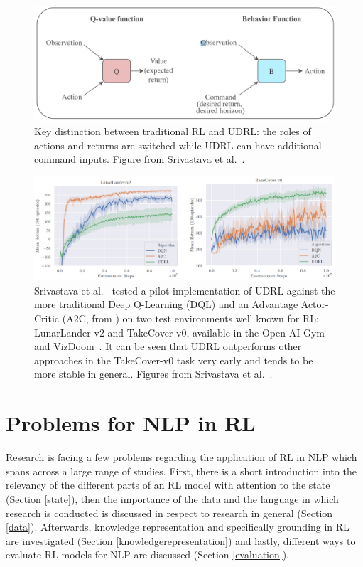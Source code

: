 \documentclass[11pt]{article}
\begin{document}
\begin{figure}[h!]
\centering
\includegraphics[scale=.42]{img/udrl_graphic.PNG}
\caption{Key distinction between traditional RL and UDRL: the roles of actions and returns are switched while UDRL can have additional command inputs. Figure from Srivastava et al.~.}
\label{fig:udrl}
\end{figure}

\begin{figure}[h!]
\centering
\includegraphics[scale=.39]{img/udrl_test_image.PNG}
\caption{Srivastava et al.~ tested a pilot implementation of UDRL against the more traditional Deep Q-Learning (DQL) and an Advantage Actor-Critic (A2C, from \cite{mnih-2015}) on two test environments well known for RL: LunarLander-v2 and TakeCover-v0, available in the Open AI Gym and VizDoom~\cite{openaigym,vizdoom}. It can be seen that UDRL outperforms other approaches in the TakeCover-v0 task very early and tends to be more stable in general. Figures from Srivastava et al.~.}
\label{fig:udrl_games}
\end{figure}
\newpage

\section{Problems for NLP in RL}\label{problems}
Research is facing a few problems regarding the application of RL in NLP which spans across a large range of studies. First, there is a short introduction into the relevancy of the different parts of an RL model with attention to the state (Section \ref{state}), then the importance of the data and the language in which research is conducted is discussed in respect to research in general (Section \ref{data}). Afterwards, knowledge representation and specifically grounding in RL are investigated (Section \ref{knowledgerepresentation}) and lastly, different ways to evaluate RL models for NLP are discussed (Section \ref{evaluation}).
\end{document}
